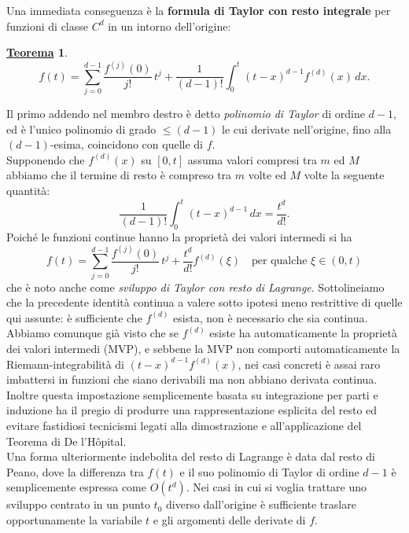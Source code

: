 \documentclass[a4paper,twoside]{article}
\theoremstyle{definition}
\newtheorem{theorem}{\color{Red}\underline{\textrm Teorema}}
\numberwithin{theorem}{section}
\begin{document}
Una immediata conseguenza è la \textbf{formula di Taylor con resto integrale} per funzioni di classe $C^d$ in un intorno dell'origine:
\begin{theorem}
 $$ f(t) = \sum_{j=0}^{d-1}\frac{f^{(j)}(0)}{j!}\,t^j + \frac{1}{(d-1)!}\int_{0}^{t}(t-x)^{d-1}f^{(d)}(x)\,dx. $$
\end{theorem}
Il primo addendo nel membro destro è detto \emph{polinomio di Taylor} di ordine $d-1$, ed è l'unico polinomio di grado $\leq (d-1)$ le cui derivate nell'origine, fino alla $(d-1)$-esima, coincidono con quelle di $f$.\\
Supponendo che $f^{(d)}(x)$ su $[0,t]$ assuma valori compresi tra $m$ ed $M$ abbiamo che il termine di resto è compreso tra $m$ volte ed $M$ volte la seguente quantità:
$$ \frac{1}{(d-1)!}\int_{0}^{t}(t-x)^{d-1}\,dx = \frac{t^d}{d!}. $$
Poiché le funzioni continue hanno la proprietà dei valori intermedi si ha
$$ f(t) = \sum_{j=0}^{d-1}\frac{f^{(j)}(0)}{j!}\,t^j + \frac{t^d}{d!}f^{(d)}(\xi)\quad\text{per qualche }\xi\in(0,t) $$
che è noto anche come \emph{sviluppo di Taylor con resto di Lagrange}. Sottolineiamo che la precedente identità continua a valere sotto ipotesi meno restrittive di quelle qui assunte: è sufficiente che $f^{(d)}$ esista, non è necessario che sia continua. Abbiamo comunque già visto che se $f^{(d)}$ esiste ha automaticamente la proprietà dei valori intermedi (MVP), e sebbene la MVP non comporti automaticamente la Riemann-integrabilità di $(t-x)^{d-1}f^{(d)}(x)$, nei casi concreti è assai raro imbattersi in funzioni che siano derivabili ma non abbiano derivata continua. Inoltre questa impostazione semplicemente basata su integrazione per parti e induzione ha il pregio di produrre una rappresentazione esplicita del resto ed evitare fastidiosi tecnicismi legati alla dimostrazione e all'applicazione del Teorema di De l'H\^opital.\\
Una forma ulteriormente indebolita del resto di Lagrange è data dal resto di Peano, dove la differenza tra $f(t)$ e il suo polinomio di Taylor di ordine $d-1$ è semplicemente espressa come $O(t^d)$. Nei casi in cui si voglia trattare uno sviluppo centrato in un punto $t_0$ diverso dall'origine è sufficiente traslare opportunamente la variabile $t$ e gli argomenti delle derivate di $f$.\\
\end{document}

